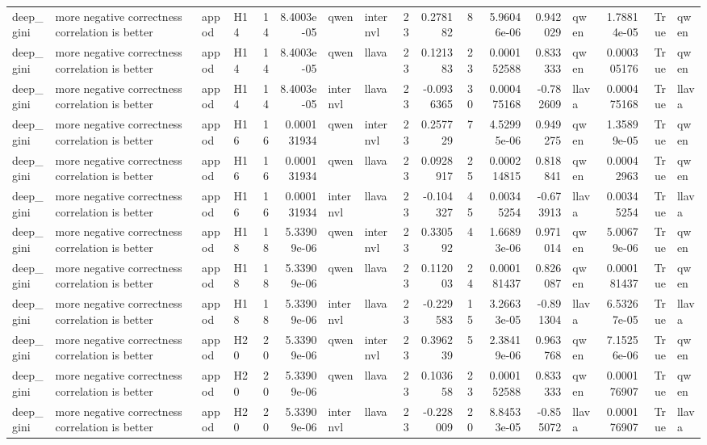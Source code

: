 \begin{longtable}{llllrrllrrrrrlrrl}
deep\_gini & more negative correctness correlation is better & appod & H14 & 14 & 8.4003e-05 & qwen & internvl & 23 & 0.278182 & 8 & 5.96046e-06 & 0.942029 & qwen & 1.78814e-05 & True & qwen \\
deep\_gini & more negative correctness correlation is better & appod & H14 & 14 & 8.4003e-05 & qwen & llava & 23 & 0.121383 & 23 & 0.000152588 & 0.833333 & qwen & 0.000305176 & True & qwen \\
deep\_gini & more negative correctness correlation is better & appod & H14 & 14 & 8.4003e-05 & internvl & llava & 23 & -0.0936365 & 30 & 0.000475168 & -0.782609 & llava & 0.000475168 & True & llava \\
deep\_gini & more negative correctness correlation is better & appod & H16 & 16 & 0.000131934 & qwen & internvl & 23 & 0.257729 & 7 & 4.52995e-06 & 0.949275 & qwen & 1.35899e-05 & True & qwen \\
deep\_gini & more negative correctness correlation is better & appod & H16 & 16 & 0.000131934 & qwen & llava & 23 & 0.0928917 & 25 & 0.000214815 & 0.818841 & qwen & 0.00042963 & True & qwen \\
deep\_gini & more negative correctness correlation is better & appod & H16 & 16 & 0.000131934 & internvl & llava & 23 & -0.104327 & 45 & 0.00345254 & -0.673913 & llava & 0.00345254 & True & llava \\
deep\_gini & more negative correctness correlation is better & appod & H18 & 18 & 5.33909e-06 & qwen & internvl & 23 & 0.330592 & 4 & 1.66893e-06 & 0.971014 & qwen & 5.00679e-06 & True & qwen \\
deep\_gini & more negative correctness correlation is better & appod & H18 & 18 & 5.33909e-06 & qwen & llava & 23 & 0.112003 & 24 & 0.000181437 & 0.826087 & qwen & 0.000181437 & True & qwen \\
deep\_gini & more negative correctness correlation is better & appod & H18 & 18 & 5.33909e-06 & internvl & llava & 23 & -0.229583 & 15 & 3.26633e-05 & -0.891304 & llava & 6.53267e-05 & True & llava \\
deep\_gini & more negative correctness correlation is better & appod & H20 & 20 & 5.33909e-06 & qwen & internvl & 23 & 0.396239 & 5 & 2.38419e-06 & 0.963768 & qwen & 7.15256e-06 & True & qwen \\
deep\_gini & more negative correctness correlation is better & appod & H20 & 20 & 5.33909e-06 & qwen & llava & 23 & 0.103658 & 23 & 0.000152588 & 0.833333 & qwen & 0.000176907 & True & qwen \\
deep\_gini & more negative correctness correlation is better & appod & H20 & 20 & 5.33909e-06 & internvl & llava & 23 & -0.228009 & 20 & 8.84533e-05 & -0.855072 & llava & 0.000176907 & True & llava \\

\end{longtable}
